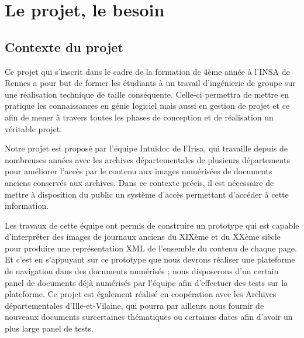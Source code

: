 \section{Le projet, le besoin}
\label{sec:intro}

    \subsection{Contexte du projet}
    \label{subsec:contexte}
    Ce projet qui s’inscrit dans le cadre de la formation de 4ème année à l’INSA de Rennes a pour but de former les étudiants à un travail d’ingénierie de groupe
    sur une réalisation technique de taille conséquente. Celle-ci permettra de mettre en pratique les connaissances en génie logiciel mais aussi en gestion de projet
    et ce afin de mener à travers toutes les phases de conception et de réalisation un véritable projet.

    Notre projet est proposé par l’équipe Intuidoc de l’Irisa, qui travaille depuis de nombreuses années avec les archives départementales de plusieurs départements
    pour améliorer l’accès par le contenu aux images numérisées de documents anciens conservés aux archives. Dans ce contexte précis, il est nécessaire de mettre à
    disposition du public un système d’accès permettant d’accéder à cette information.

    Les travaux de cette équipe ont permis de construire un prototype qui est capable d’interpréter des images de journaux anciens du XIXème et du XXème siècle pour
    produire une représentation XML de l’ensemble du contenu de chaque page. Et c’est en s’appuyant sur ce prototype que nous devrons réaliser une plateforme de
    navigation dans des documents numérisés ; nous disposerons d’un certain panel de documents déjà numérisés par l’équipe afin d’effectuer des tests sur la plateforme.
    Ce projet est également réalisé en coopération avec les Archives départementales d’Ille-et-Vilaine, qui pourra par ailleurs nous fournir de nouveaux documents
    surcertaines thématiques ou certaines dates afin d’avoir un plus large panel de tests.

